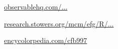 \begin{description}[font=\normalfont,itemsep=0pt]
    \item[D3]
        \href{https://observablehq.com/@d3/color-schemes}{observablehq.com/...}

    \item[R]
        \href{http://research.stowers.org/mcm/efg/R/Color/Chart/}{research.stowers.org/mcm/efg/R/...}

    \item[Warm beige]
        \href{https://encycolorpedia.com/cfb997}{encycolorpedia.com/cfb997}

\end{description}
